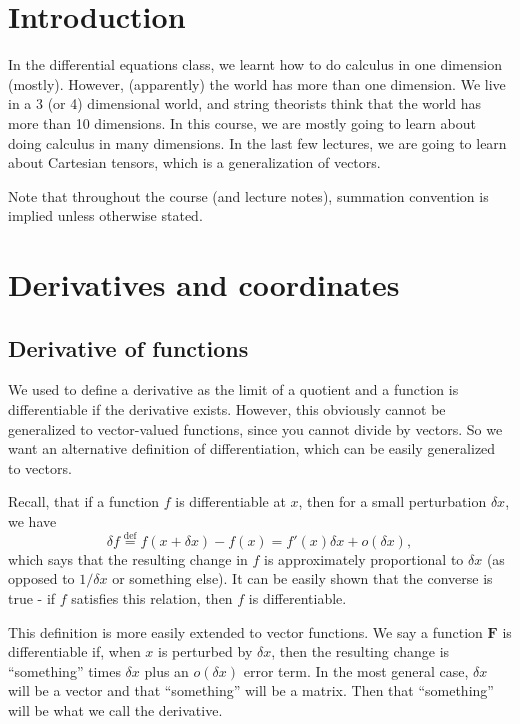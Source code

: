 \documentclass[a4paper]{article}
\begin{document}
\tableofcontents

\setcounter{section}{-1}
\section{Introduction}
In the differential equations class, we learnt how to do calculus in one dimension (mostly). However, (apparently) the world has more than one dimension. We live in a 3 (or 4) dimensional world, and string theorists think that the world has more than 10 dimensions. In this course, we are mostly going to learn about doing calculus in many dimensions. In the last few lectures, we are going to learn about Cartesian tensors, which is a generalization of vectors.

Note that throughout the course (and lecture notes), summation convention is implied unless otherwise stated.

\section{Derivatives and coordinates}
\subsection{Derivative of functions}
We used to define a derivative as the limit of a quotient and a function is differentiable if the derivative exists. However, this obviously cannot be generalized to vector-valued functions, since you cannot divide by vectors. So we want an alternative definition of differentiation, which can be easily generalized to vectors.

Recall, that if a function $f$ is differentiable at $x$, then for a small perturbation $\delta x$, we have
\[
  \delta f \stackrel{\text{def}}{=} f(x + \delta x) - f(x) = f'(x) \delta x + o(\delta x),
\]
which says that the resulting change in $f$ is approximately proportional to $\delta x$ (as opposed to $1/\delta x$ or something else). It can be easily shown that the converse is true - if $f$ satisfies this relation, then $f$ is differentiable.

This definition is more easily extended to vector functions. We say a function $\mathbf{F}$ is differentiable if, when $x$ is perturbed by $\delta x$, then the resulting change is ``something'' times $\delta x$ plus an $o(\delta x)$ error term. In the most general case, $\delta x$ will be a vector and that ``something'' will be a matrix. Then that ``something'' will be what we call the derivative.
\end{document}
